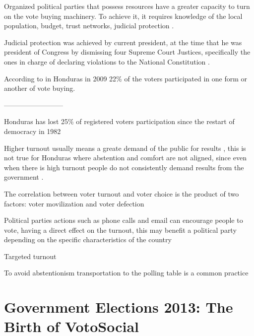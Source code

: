 \documentclass[a4paper,10pt]{article}
\begin{document}
Organized political parties that possess resources have a greater capacity to turn on the vote buying machinery. To achieve it, it requires knowledge of the local population, budget, trust networks, judicial protection \citep{gonza2014}.

Judicial protection was achieved by current president, at the time that he was president of Congress by dismissing four Supreme Court Justices, specifically the ones in charge of declaring violations to the National Constitution \citep{csj2012}.

According to \cite{gonza2014} in Honduras in 2009 22\% of the voters participated in one form or another of vote buying.

--------------------------

Honduras has lost 25\% of registered voters participation since the restart of democracy in 1982 \citep{romero2014}

Higher turnout usually means a greate demand of the public for results \citep{mac2003}, this is not true for Honduras where abstention and comfort are not aligned, since even when there is high turnout people do not consistently demand results from the government \citep{romero2014}.

The correlation between voter turnout and voter choice is the product of two factors: voter movilization and voter defection \citep{osborn2010}

Political parties actions such as phone calls and email can encourage people to vote, having a direct effect on the turnout, this may benefit a political party depending on the specific characteristics of the country \citep{osborn2010}

Targeted turnout

To avoid abstentionism transportation to the polling table is a common practice \citep{romero2014}




\section{Government Elections 2013: The Birth of VotoSocial}
\end{document}
